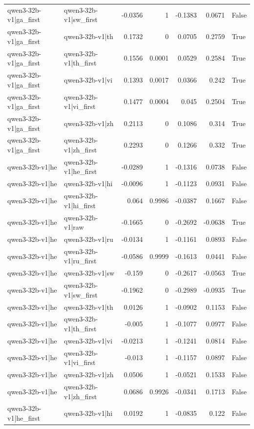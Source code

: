 \begin{table}
\begin{tabular}{l l r r r r l}
qwen3-32b-v1|ga_first & qwen3-32b-v1|sw_first & -0.0356 & 1 & -0.1383 & 0.0671 & False \\
qwen3-32b-v1|ga_first & qwen3-32b-v1|th & 0.1732 & 0 & 0.0705 & 0.2759 & True \\
qwen3-32b-v1|ga_first & qwen3-32b-v1|th_first & 0.1556 & 0.0001 & 0.0529 & 0.2584 & True \\
qwen3-32b-v1|ga_first & qwen3-32b-v1|vi & 0.1393 & 0.0017 & 0.0366 & 0.242 & True \\
qwen3-32b-v1|ga_first & qwen3-32b-v1|vi_first & 0.1477 & 0.0004 & 0.045 & 0.2504 & True \\
qwen3-32b-v1|ga_first & qwen3-32b-v1|zh & 0.2113 & 0 & 0.1086 & 0.314 & True \\
qwen3-32b-v1|ga_first & qwen3-32b-v1|zh_first & 0.2293 & 0 & 0.1266 & 0.332 & True \\
qwen3-32b-v1|he & qwen3-32b-v1|he_first & -0.0289 & 1 & -0.1316 & 0.0738 & False \\
qwen3-32b-v1|he & qwen3-32b-v1|hi & -0.0096 & 1 & -0.1123 & 0.0931 & False \\
qwen3-32b-v1|he & qwen3-32b-v1|hi_first & 0.064 & 0.9986 & -0.0387 & 0.1667 & False \\
qwen3-32b-v1|he & qwen3-32b-v1|raw & -0.1665 & 0 & -0.2692 & -0.0638 & True \\
qwen3-32b-v1|he & qwen3-32b-v1|ru & -0.0134 & 1 & -0.1161 & 0.0893 & False \\
qwen3-32b-v1|he & qwen3-32b-v1|ru_first & -0.0586 & 0.9999 & -0.1613 & 0.0441 & False \\
qwen3-32b-v1|he & qwen3-32b-v1|sw & -0.159 & 0 & -0.2617 & -0.0563 & True \\
qwen3-32b-v1|he & qwen3-32b-v1|sw_first & -0.1962 & 0 & -0.2989 & -0.0935 & True \\
qwen3-32b-v1|he & qwen3-32b-v1|th & 0.0126 & 1 & -0.0902 & 0.1153 & False \\
qwen3-32b-v1|he & qwen3-32b-v1|th_first & -0.005 & 1 & -0.1077 & 0.0977 & False \\
qwen3-32b-v1|he & qwen3-32b-v1|vi & -0.0213 & 1 & -0.1241 & 0.0814 & False \\
qwen3-32b-v1|he & qwen3-32b-v1|vi_first & -0.013 & 1 & -0.1157 & 0.0897 & False \\
qwen3-32b-v1|he & qwen3-32b-v1|zh & 0.0506 & 1 & -0.0521 & 0.1533 & False \\
qwen3-32b-v1|he & qwen3-32b-v1|zh_first & 0.0686 & 0.9926 & -0.0341 & 0.1713 & False \\
qwen3-32b-v1|he_first & qwen3-32b-v1|hi & 0.0192 & 1 & -0.0835 & 0.122 & False \\

\end{tabular}
\end{table}
